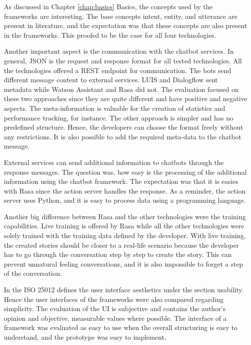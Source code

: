 As discussed in Chapter \ref{chap:basics} Basics, the concepts used by the frameworks are interesting.
The base concepts intent, entity, and utterance are present in literature, and the expectation was that these concepts are also present in the frameworks.
This proofed to be the case for all four technologies.

Another important aspect is the communication with the chatbot services.
In general, JSON is the request and response format for all tested technologies.
All the technologies offered a REST endpoint for communication.
The bots send different message content to external services.
LUIS and Dialogflow sent metadata while Watson Assistant and Rasa did not.
The evaluation focused on these two approaches since they are quite different and have positive and negative aspects.
The meta-information is valuable for the creation of statistics and performance tracking, for instance.
The other approach is simpler and has no predefined structure.
Hence, the developers can choose the format freely without any restrictions.
It is also possible to add the required meta-data to the chatbot message. 

External services can send additional information to chatbots through the response messages.
The question was, how easy is the processing of the additional information using the chatbot framework.
The expectation was that it is easies with Rasa since the action server handles the response.
As a reminder, the action server uses Python, and it is easy to process data using a programming language.

Another big difference between Rasa and the other technologies were the 
training capabilities.
Live training is offered by Rasa while all the other technologies 
were solely trained with the training data defined by the developer.
With live training, the created stories should be closer 
to a real-life scenario because the developer has to go through the conversation step by step to create the story.
This can prevent unnatural feeling conversations, and it is also impossible to forget a step of the conversation.

In the ISO 25012\cite{iso25010} defines the user interface aesthetics under the section usability. 
Hence the user interfaces of the frameworks were also compared regarding simplicity.
The evaluation of the UI is subjective and contains the author's opinion and objective, measurable values where possible.
The interface of a framework was evaluated as easy to use when the overall structuring is easy to understand, and the prototype was easy to implement.

